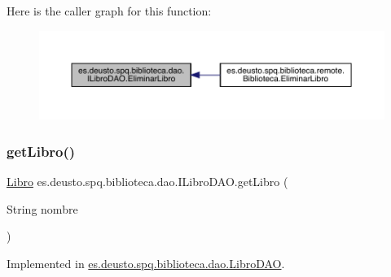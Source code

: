 Here is the caller graph for this function\+:
\nopagebreak
\begin{figure}[H]
\begin{center}
\leavevmode
\includegraphics[width=350pt]{interfacees_1_1deusto_1_1spq_1_1biblioteca_1_1dao_1_1_i_libro_d_a_o_afb545c6295192e9cde403bf72dbc5818_icgraph}
\end{center}
\end{figure}
\mbox{\label{interfacees_1_1deusto_1_1spq_1_1biblioteca_1_1dao_1_1_i_libro_d_a_o_a1406f445c6462b6ef7a6d53422650f20}} 
\subsubsection{\texorpdfstring{get\+Libro()}{getLibro()}}
{\footnotesize\ttfamily \mbox{\hyperlink{classes_1_1deusto_1_1spq_1_1biblioteca_1_1data_1_1_libro}{Libro}} es.\+deusto.\+spq.\+biblioteca.\+dao.\+I\+Libro\+D\+A\+O.\+get\+Libro (\begin{DoxyParamCaption}\item[{String}]{nombre }\end{DoxyParamCaption})}



Implemented in \mbox{\hyperlink{classes_1_1deusto_1_1spq_1_1biblioteca_1_1dao_1_1_libro_d_a_o_a9b8af041955b5e4abd0e96b7da68a35a}{es.\+deusto.\+spq.\+biblioteca.\+dao.\+Libro\+D\+AO}}.

